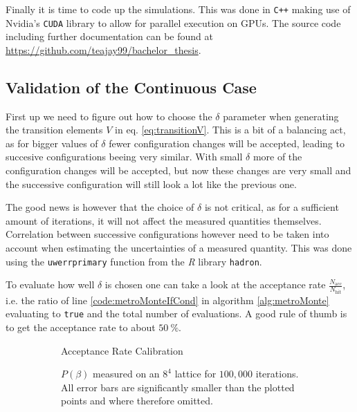 Finally it is time to code up the simulations. This was done in \texttt{C++} making use of Nvidia's \texttt{CUDA} library to allow for parallel execution on GPUs. The source code including further documentation can be found at \url{https://github.com/teajay99/bachelor_thesis}.\\

\subsection{Validation of the Continuous Case}

First up we need to figure out how to choose the $\delta$ parameter when generating the transition elements $V$ in eq. \ref{eq:transitionV}. This is a bit of a balancing act, as for bigger values of $\delta$ fewer configuration changes will be accepted, leading to succesive configurations beeing very similar. With small $\delta$ more of the configuration changes will be accepted, but now these changes are very small and the successive configuration will still look a lot like the previous one.

The good news is however that the choice of $\delta$ is not critical, as for a sufficient amount of iterations, it will not affect the measured quantities themselves. Correlation between successive configurations however need to be taken into account when estimating the uncertainties of a measured quantity. This was done using the \texttt{uwerrprimary} function from the \emph{R} library \texttt{hadron}.

To evaluate how well $\delta$ is chosen one can take a look at the acceptance rate $\frac{N_{\textrm{acc}}}{N_{\textrm{hit}}}$, i.e. the ratio of line \ref{code:metroMonteIfCond} in algorithm \ref{alg:metroMonte} evaluating to \texttt{true} and the total number of evaluations. A good rule of thumb is to get the acceptance rate to about $\SI{50}{\%}$.
\begin{figure}[!hbt]
 \centering
 \begin{subfigure}[t]{0.49\textwidth}
  
  \caption{Acceptance Rate Calibration}
  \label{plot:calibHitRate}
 \end{subfigure}
 \begin{subfigure}[t]{0.49\textwidth}
  
  \caption{$P(\beta)$ measured on an $8^4$ lattice for $100,000$ iterations. All error bars are significantly smaller than the plotted points and where therefore omitted.}
  \label{plot:refDataSet}
 \end{subfigure}
 \caption{}
\end{figure}

